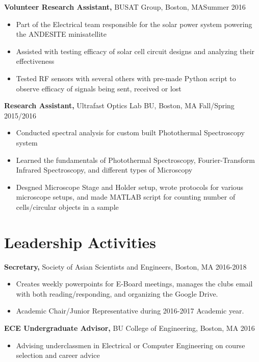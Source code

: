 \documentclass[margin]{res}
\begin{document}
\begin{resume}
 
 
{\bf Volunteer Research Assistant,} BUSAT Group, Boston, MA\hfill  Summer 2016
\begin{itemize} \itemsep -0.1pt %
\item Part of the Electrical team responsible for the solar power system powering the ANDESITE minisatellite
\item Assisted with testing efficacy of solar cell circuit designs and analyzing their effectiveness 
\item Tested RF sensors with several others with pre-made Python script to observe efficacy of signals being sent, received or lost
\end{itemize}


{\bf Research Assistant,} Ultrafast Optics Lab BU, Boston, MA \hfill Fall/Spring 2015/2016
			\begin{itemize} \itemsep -2pt
			\item  Conducted spectral analysis for custom built Photothermal Spectroscopy system
			\item Learned the fundamentals of Photothermal Spectroscopy, Fourier-Transform Infrared Spectroscopy, and different types of Microscopy 
			\item Desgned Microscope Stage and Holder setup, wrote protocols for various microscope setups, and made MATLAB script for counting number of cells/circular objects in a sample
			\end{itemize}
\section{Leadership   Activities} 
               {\bf Secretary,} Society of Asian Scientists and Engineers, Boston, MA    \hfill         2016-2018
                \begin{itemize} \itemsep -0.5pt
                \item Creates weekly powerpoints for E-Board meetings, manages the clubs email with both reading/responding, and organizing the Google Drive.
              \item Academic Chair/Junior Representative during 2016-2017 Academic year.

		 \end{itemize}
   {\bf ECE Undergraduate Advisor,} BU College of Engineering, Boston, MA    \hfill         2016 
                \begin{itemize} \itemsep -2pt
              \item Advising underclassmen in Electrical or Computer Engineering on course selection and career advice \\
                 


\end{itemize}
\end{resume}
\end{document}
